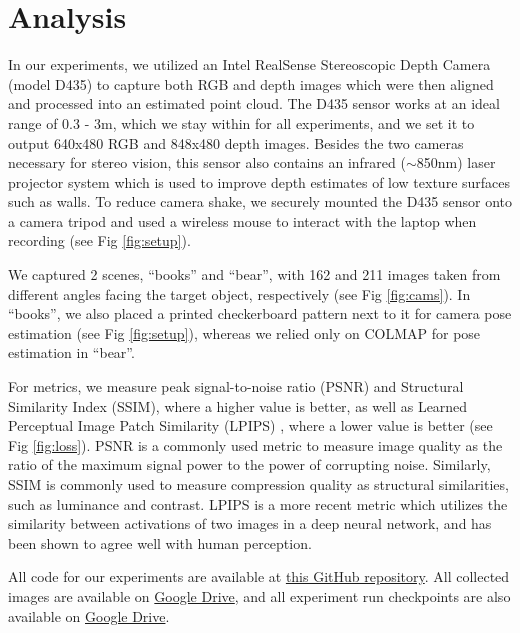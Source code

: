 \documentclass[10pt,twocolumn,letterpaper]{article}
\begin{document}
\section{Analysis}
In our experiments, we utilized an Intel RealSense Stereoscopic Depth Camera (model D435) to capture both RGB and depth images which were then aligned and processed into an estimated point cloud. The D435 sensor works at an ideal range of 0.3 - 3m, which we stay within for all experiments, and we set it to output 640x480 RGB and 848x480 depth images. Besides the two cameras necessary for stereo vision, this sensor also contains an infrared ($\sim$850nm) laser projector system which is used to improve depth estimates of low texture surfaces such as walls. 
To reduce camera shake, we securely mounted the D435 sensor onto a camera tripod and used a wireless mouse to interact with the laptop when recording (see Fig \ref{fig:setup}).


We captured 2 scenes, “books” and “bear”, with 162 and 211 images taken from different angles facing the target object, respectively (see Fig \ref{fig:cams}). In “books”, we also placed a printed checkerboard pattern next to it for camera pose estimation (see Fig \ref{fig:setup}), whereas we relied only on COLMAP for pose estimation in “bear”. 

For metrics, we measure peak signal-to-noise ratio (PSNR) and Structural Similarity Index (SSIM), where a higher value is better, as well as Learned Perceptual Image Patch Similarity (LPIPS) \cite{LPIPS}, where a lower value is better (see Fig \ref{fig:loss}). PSNR is a commonly used metric to measure image quality as the ratio of the maximum signal power to the power of corrupting noise. Similarly, SSIM is commonly used to measure compression quality as structural similarities, such as luminance and contrast. LPIPS is a more recent metric which utilizes the similarity between activations of two images in a deep neural network, and has been shown to agree well with human perception. 

All code for our experiments are available at \href{https://github.com/JasonTang99/point-nerf-coarse-depth}{this GitHub repository}. All collected images are available on \href{https://drive.google.com/file/d/1GoUAKg_cYg8mOlF4c6UzspSZBblQxR9W/view?usp=sharing}{Google Drive}, and all experiment run checkpoints are also available on \href{https://drive.google.com/file/d/12V81zXsEQGoPJjw1pRJ4FXC-id6qfmXd/view?usp=sharing}{Google Drive}.
\end{document}
